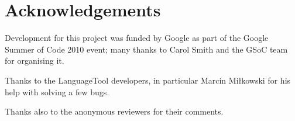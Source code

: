 \documentclass[11pt]{article}
\begin{document}
\section*{Acknowledgements}

Development for this project was funded by Google as part of the 
Google Summer of Code 2010 event; many thanks to Carol Smith and the 
GSoC team for organising it.


Thanks to the LanguageTool developers, in particular Marcin Miłkowski 
for his help with solving a few bugs.

Thanks also to the anonymous reviewers for their comments.



\end{document}
